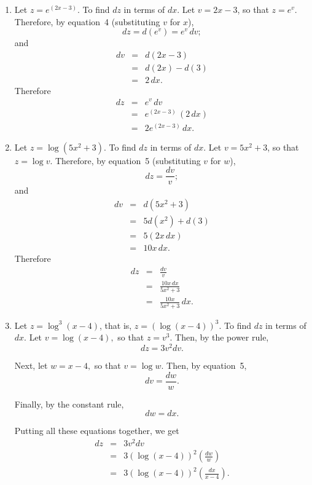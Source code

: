 \documentclass[polutonikogreek,english,twoside,openright]{article}
\newlength{\oldjot}
\begin{document}
\begin{enumerate}
\item Let $z = e^{(2x-3)}$.  To find $dz$ in terms of $dx$.  Let
  $v= 2x-3$, so that $z = e^v$.  Therefore, by equation~4
  (substituting $v$ for $x$),
$$dz = d(e^v) = e^v\,dv;$$
and 
\setlength{\jot}{1.5ex}
\begin{eqnarray*}
dv & = & d(2x-3)\\
& = & d(2x) -d(3)\\
& = & 2\,dx.
\end{eqnarray*}
Therefore 
\begin{eqnarray*}
dz & = & e^v\,dv \\
& = & e^{(2x-3)}\,(2\,dx)\\
& = & 2e^{(2x - 3)}\,dx.
\end{eqnarray*}

\item Let $z = \log(5x^2 + 3).$ To find $dz$ in terms of $dx$.  Let
  $v= 5x^2 + 3$, so that $z= \log v$.  Therefore, by equation~5
  (substituting $v$ for $w$),
$$dz =  \frac{dv}{v};$$
and
\begin{eqnarray*}
dv &  = & d(5x^2 + 3)\\
& = & 5d(x^2) + d(3)\\
& = & 5(2x\,dx)\\
& = & 10x\,dx.
\end{eqnarray*}
Therefore
\begin{eqnarray*}
dz & = & \frac{dv}{v} \\
& = & \frac{10x\,dx}{5x^2 + 3}\\
& = & \frac{10x}{5x^2+ 3}\,dx.
\end{eqnarray*}

\item Let $z = \log^3(x-4)$, that is, $z = (\log(x-4))^3.$ To find
  $dz$ in terms of $dx$.  Let $v= \log(x-4),$ so that $z = v^3.$ Then,
  by the power rule,
$$dz = 3v^2dv.$$

Next, let $w = x-4,$ so that $v = \log w$.  Then, by equation~5,
$$dv = \frac{dw}{w}.$$

Finally, by the constant rule, 
$$dw = dx.$$

Putting all these equations together, we get
\begin{eqnarray*}
dz & = & 3v^2dv\\
& = & 3(\log(x-4))^2\left(\frac{dw}{w}\right)\\
& = & 3(\log(x-4))^2\left(\frac{dx}{x-4}\right).
\end{eqnarray*}

\setlength{\jot}{\oldjot}
\end{enumerate}
\end{document}
